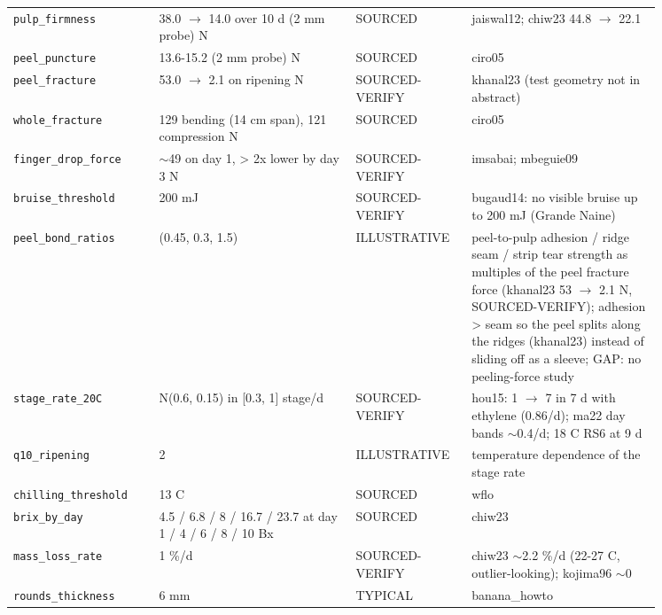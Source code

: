 \documentclass[10.5pt,a4paper]{article}
\begin{document}
{\begin{longtable}{@{}p{0.2\linewidth}p{0.27\linewidth}p{0.12\linewidth}p{0.26\linewidth}@{}}
\texttt{pulp\_\allowbreak{}firmness} & 38.0 $\to$ 14.0 over 10 d (2 mm probe) N & SOURCED & jaiswal12; chiw23 44.8 $\to$ 22.1 \\
\texttt{peel\_\allowbreak{}puncture} & 13.6-15.2 (2 mm probe) N & SOURCED & ciro05 \\
\texttt{peel\_\allowbreak{}fracture} & 53.0 $\to$ 2.1 on ripening N & SOURCED-VERIFY & khanal23 (test geometry not in abstract) \\
\texttt{whole\_\allowbreak{}fracture} & 129 bending (14 cm span), 121 compression N & SOURCED & ciro05 \\
\texttt{finger\_\allowbreak{}drop\_\allowbreak{}force} & $\sim$49 on day 1, > 2x lower by day 3 N & SOURCED-VERIFY & imsabai; mbeguie09 \\
\texttt{bruise\_\allowbreak{}threshold} & 200 mJ & SOURCED-VERIFY & bugaud14: no visible bruise up to 200 mJ (Grande Naine) \\
\texttt{peel\_\allowbreak{}bond\_\allowbreak{}ratios} & (0.45, 0.3, 1.5) & ILLUSTRATIVE & peel-to-pulp adhesion / ridge seam / strip tear strength as multiples of the peel fracture force (khanal23 53 $\to$ 2.1 N, SOURCED-VERIFY); adhesion > seam so the peel splits along the ridges (khanal23) instead of sliding off as a sleeve; GAP: no peeling-force study \\
\texttt{stage\_\allowbreak{}rate\_\allowbreak{}20C} & N(0.6, 0.15) in [0.3, 1] stage/d & SOURCED-VERIFY & hou15: 1 $\to$ 7 in 7 d with ethylene (0.86/d); ma22 day bands $\sim$0.4/d; 18 C RS6 at 9 d \\
\texttt{q10\_\allowbreak{}ripening} & 2 & ILLUSTRATIVE & temperature dependence of the stage rate \\
\texttt{chilling\_\allowbreak{}threshold} & 13 C & SOURCED & wflo \\
\texttt{brix\_\allowbreak{}by\_\allowbreak{}day} & 4.5 / 6.8 / 8 / 16.7 / 23.7 at day 1 / 4 / 6 / 8 / 10 Bx & SOURCED & chiw23 \\
\texttt{mass\_\allowbreak{}loss\_\allowbreak{}rate} & 1 \%/d & SOURCED-VERIFY & chiw23 $\sim$2.2 \%/d (22-27 C, outlier-looking); kojima96 $\sim$0 \\
\texttt{rounds\_\allowbreak{}thickness} & 6 mm & TYPICAL & banana\_howto \\\bottomrule\end{longtable}}
\end{document}
